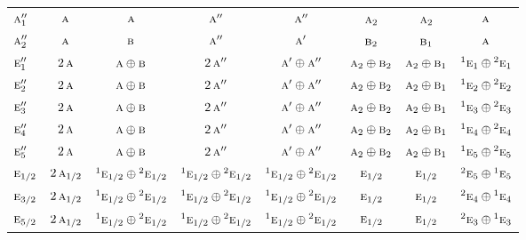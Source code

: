 \documentclass[10pt,a4paper]{article}
\numberwithin{equation}{section}
\newcommand{\irr}[1]{\text{\normalfont\scshape #1}}
\newcommand{\conjpair}[1]{{}^{#1}}
\begin{document}
{\begin{longtable}{@{}lccccccc@{}}
$\irr{a}_{1}''$ & $\irr{a}$ & $\irr{a}$ & $\irr{a}''$ & $\irr{a}''$ & $\irr{a}_{2}$ & $\irr{a}_{2}$ & $\irr{a}$\\
$\irr{a}_{2}''$ & $\irr{a}$ & $\irr{b}$ & $\irr{a}''$ & $\irr{a}'$ & $\irr{b}_{2}$ & $\irr{b}_{1}$ & $\irr{a}$\\
$\irr{e}_{1}''$ & $2\,\irr{a}$ & $\irr{a}\oplus \irr{b}$ & $2\,\irr{a}''$ & $\irr{a}'\oplus \irr{a}''$ & $\irr{a}_{2}\oplus \irr{b}_{2}$ & $\irr{a}_{2}\oplus \irr{b}_{1}$ & $\conjpair{1}\irr{e}_{1}\oplus \conjpair{2}\irr{e}_{1}$\\
$\irr{e}_{2}''$ & $2\,\irr{a}$ & $\irr{a}\oplus \irr{b}$ & $2\,\irr{a}''$ & $\irr{a}'\oplus \irr{a}''$ & $\irr{a}_{2}\oplus \irr{b}_{2}$ & $\irr{a}_{2}\oplus \irr{b}_{1}$ & $\conjpair{1}\irr{e}_{2}\oplus \conjpair{2}\irr{e}_{2}$\\
$\irr{e}_{3}''$ & $2\,\irr{a}$ & $\irr{a}\oplus \irr{b}$ & $2\,\irr{a}''$ & $\irr{a}'\oplus \irr{a}''$ & $\irr{a}_{2}\oplus \irr{b}_{2}$ & $\irr{a}_{2}\oplus \irr{b}_{1}$ & $\conjpair{1}\irr{e}_{3}\oplus \conjpair{2}\irr{e}_{3}$\\
$\irr{e}_{4}''$ & $2\,\irr{a}$ & $\irr{a}\oplus \irr{b}$ & $2\,\irr{a}''$ & $\irr{a}'\oplus \irr{a}''$ & $\irr{a}_{2}\oplus \irr{b}_{2}$ & $\irr{a}_{2}\oplus \irr{b}_{1}$ & $\conjpair{1}\irr{e}_{4}\oplus \conjpair{2}\irr{e}_{4}$\\
$\irr{e}_{5}''$ & $2\,\irr{a}$ & $\irr{a}\oplus \irr{b}$ & $2\,\irr{a}''$ & $\irr{a}'\oplus \irr{a}''$ & $\irr{a}_{2}\oplus \irr{b}_{2}$ & $\irr{a}_{2}\oplus \irr{b}_{1}$ & $\conjpair{1}\irr{e}_{5}\oplus \conjpair{2}\irr{e}_{5}$\\
$\irr{e}_{1/2}$ & $2\,\irr{a}_{1/2}$ & $\conjpair{1}\irr{e}_{1/2}\oplus \conjpair{2}\irr{e}_{1/2}$ & $\conjpair{1}\irr{e}_{1/2}\oplus \conjpair{2}\irr{e}_{1/2}$ & $\conjpair{1}\irr{e}_{1/2}\oplus \conjpair{2}\irr{e}_{1/2}$ & $\irr{e}_{1/2}$ & $\irr{e}_{1/2}$ & $\conjpair{2}\irr{e}_{5}\oplus \conjpair{1}\irr{e}_{5}$\\
$\irr{e}_{3/2}$ & $2\,\irr{a}_{1/2}$ & $\conjpair{1}\irr{e}_{1/2}\oplus \conjpair{2}\irr{e}_{1/2}$ & $\conjpair{1}\irr{e}_{1/2}\oplus \conjpair{2}\irr{e}_{1/2}$ & $\conjpair{1}\irr{e}_{1/2}\oplus \conjpair{2}\irr{e}_{1/2}$ & $\irr{e}_{1/2}$ & $\irr{e}_{1/2}$ & $\conjpair{2}\irr{e}_{4}\oplus \conjpair{1}\irr{e}_{4}$\\
$\irr{e}_{5/2}$ & $2\,\irr{a}_{1/2}$ & $\conjpair{1}\irr{e}_{1/2}\oplus \conjpair{2}\irr{e}_{1/2}$ & $\conjpair{1}\irr{e}_{1/2}\oplus \conjpair{2}\irr{e}_{1/2}$ & $\conjpair{1}\irr{e}_{1/2}\oplus \conjpair{2}\irr{e}_{1/2}$ & $\irr{e}_{1/2}$ & $\irr{e}_{1/2}$ & $\conjpair{2}\irr{e}_{3}\oplus \conjpair{1}\irr{e}_{3}$\\

\end{longtable}}
\end{document}
